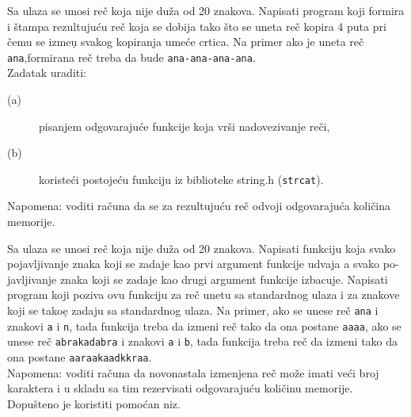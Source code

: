 \begin{Exercise}[label=p2.3_] 
Sa ulaza se unosi re\v c koja nije du\v za od 20 znakova. Napisati program
koji formira i \v stampa rezultuju\'cu re\v c koja se dobija tako \v sto se 
uneta re\v c kopira 4 puta pri \v cemu se izme\d u svakog kopiranja ume\'ce 
crtica. Na primer ako je uneta re\v c \verb|ana|,formirana re\v c treba da 
bude \verb|ana-ana-ana-ana|.\\
Zadatak uraditi:
\begin{description}
\item[(a)] pisanjem odgovaraju\'ce funkcije koja vr\v si nadovezivanje re\v ci,
\item[(b)] koriste\'ci postoje\'cu funkciju iz biblioteke string.h (\verb|strcat|).
\end{description}
Napomena: voditi ra\v cuna da se za rezultuju\'cu re\v c odvoji odgovaraju\'ca 
koli\v cina memorije.
\end{Exercise}
\begin{Answer}[ref=p2.3_]
\end{Answer}

\begin{Exercise}[label=p2.3_] 
Sa ulaza se unosi re\v c koja nije du\v za od 20 znakova. Napisati
funkciju koja svako pojavljivanje znaka koji se zadaje kao prvi
argument funkcije udvaja a svako po- javljivanje znaka koji se zadaje
kao drugi argument funkcije izbacuje. Napisati program koji poziva ovu
funkciju za re\v c unetu sa standardnog ulaza i za znakove koji se
tako\d e zadaju sa standardnog ulaza. Na primer, ako se unese re\v c
\verb|ana| i znakovi \verb|a| i \verb|n|, tada funkcija treba da
izmeni re\v c tako da ona postane \verb|aaaa|, ako se unese re\v c
\verb|abrakadabra| i znakovi \verb|a| i \verb|b|, tada funkcija treba
re\v c da izmeni tako da ona postane
\verb|aaraakaadkkraa|.\\ Napomena: voditi ra\v cuna da novonastala
izmenjena re\v c mo\v ze imati ve\'ci broj karaktera i u skladu sa tim
rezervisati odgovaraju\'cu koli\v cinu memorije. Dopu\v steno je
koristiti pomo\' can niz. \\
\end{Exercise}
\begin{Answer}[ref=p2.3_]
\end{Answer}


